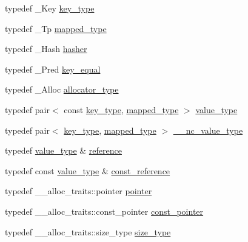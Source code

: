 \begin{DoxyCompactItemize}
\item 
typedef \+\_\+\+Key \hyperlink{classunordered__multimap_a2902747087a03531493d30e9840f67d9}{key\+\_\+type}
\item 
typedef \+\_\+\+Tp \hyperlink{classunordered__multimap_a50bc9bc504d96ff3c7ca7db1f428eb5e}{mapped\+\_\+type}
\item 
typedef \+\_\+\+Hash \hyperlink{classunordered__multimap_a93affc33f5ee930cff353ff62d20daef}{hasher}
\item 
typedef \+\_\+\+Pred \hyperlink{classunordered__multimap_aeed817e3baaf0771b8336eb2477f4f02}{key\+\_\+equal}
\item 
typedef \+\_\+\+Alloc \hyperlink{classunordered__multimap_a821ff3be687cecd9ef325efa93759c19}{allocator\+\_\+type}
\item 
typedef pair$<$ const \hyperlink{classunordered__multimap_a2902747087a03531493d30e9840f67d9}{key\+\_\+type}, \hyperlink{classunordered__multimap_a50bc9bc504d96ff3c7ca7db1f428eb5e}{mapped\+\_\+type} $>$ \hyperlink{classunordered__multimap_a106d390dc0deafc47f10d3943b247ee6}{value\+\_\+type}
\item 
typedef pair$<$ \hyperlink{classunordered__multimap_a2902747087a03531493d30e9840f67d9}{key\+\_\+type}, \hyperlink{classunordered__multimap_a50bc9bc504d96ff3c7ca7db1f428eb5e}{mapped\+\_\+type} $>$ \hyperlink{classunordered__multimap_a02f7a45f9e19d7a13e361aa3509af744}{\+\_\+\+\_\+nc\+\_\+value\+\_\+type}
\item 
typedef \hyperlink{classunordered__multimap_a106d390dc0deafc47f10d3943b247ee6}{value\+\_\+type} \& \hyperlink{classunordered__multimap_a0c14a599081fd7cef3adfd73572a78be}{reference}
\item 
typedef const \hyperlink{classunordered__multimap_a106d390dc0deafc47f10d3943b247ee6}{value\+\_\+type} \& \hyperlink{classunordered__multimap_ab3aedd41dcc9c645d596c98ba3379826}{const\+\_\+reference}
\item 
typedef \+\_\+\+\_\+alloc\+\_\+traits\+::pointer \hyperlink{classunordered__multimap_ace9882ddb645e0c73785f46e8c0fc9f4}{pointer}
\item 
typedef \+\_\+\+\_\+alloc\+\_\+traits\+::const\+\_\+pointer \hyperlink{classunordered__multimap_ac431051a949a339b15eb3c6f0ff5dccf}{const\+\_\+pointer}
\item 
typedef \+\_\+\+\_\+alloc\+\_\+traits\+::size\+\_\+type \hyperlink{classunordered__multimap_a977c4093df6d4d0302f280de19af4b58}{size\+\_\+type}
\item 

\end{DoxyCompactItemize}
